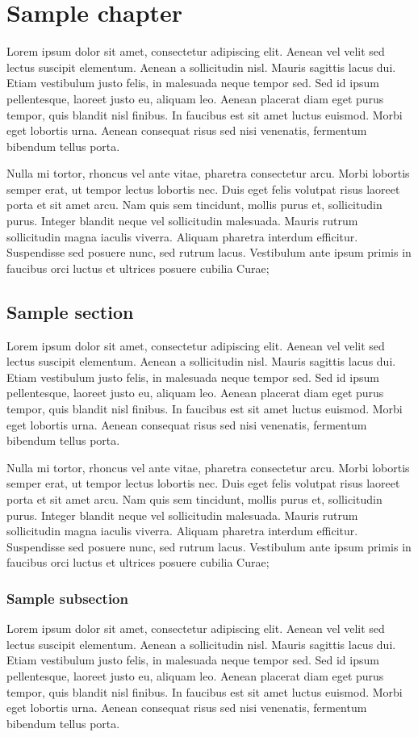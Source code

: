 \chapter{Sample chapter}
Lorem ipsum dolor sit amet, consectetur adipiscing elit. Aenean vel velit sed lectus suscipit elementum. Aenean a sollicitudin nisl. Mauris sagittis lacus dui. Etiam vestibulum justo felis, in malesuada neque tempor sed. Sed id ipsum pellentesque, laoreet justo eu, aliquam leo. Aenean placerat diam eget purus tempor, quis blandit nisl finibus. In faucibus est sit amet luctus euismod. Morbi eget lobortis urna. Aenean consequat risus sed nisi venenatis, fermentum bibendum tellus porta.

Nulla mi tortor, rhoncus vel ante vitae, pharetra consectetur arcu. Morbi lobortis semper erat, ut tempor lectus lobortis nec. Duis eget felis volutpat risus laoreet porta et sit amet arcu. Nam quis sem tincidunt, mollis purus et, sollicitudin purus. Integer blandit neque vel sollicitudin malesuada. Mauris rutrum sollicitudin magna iaculis viverra. Aliquam pharetra interdum efficitur. Suspendisse sed posuere nunc, sed rutrum lacus. Vestibulum ante ipsum primis in faucibus orci luctus et ultrices posuere cubilia Curae;


\section{Sample section}
Lorem ipsum dolor sit amet, consectetur adipiscing elit. Aenean vel velit sed lectus suscipit elementum. Aenean a sollicitudin nisl. Mauris sagittis lacus dui. Etiam vestibulum justo felis, in malesuada neque tempor sed. Sed id ipsum pellentesque, laoreet justo eu, aliquam leo. Aenean placerat diam eget purus tempor, quis blandit nisl finibus. In faucibus est sit amet luctus euismod. Morbi eget lobortis urna. Aenean consequat risus sed nisi venenatis, fermentum bibendum tellus porta.

Nulla mi tortor, rhoncus vel ante vitae, pharetra consectetur arcu. Morbi lobortis semper erat, ut tempor lectus lobortis nec. Duis eget felis volutpat risus laoreet porta et sit amet arcu. Nam quis sem tincidunt, mollis purus et, sollicitudin purus. Integer blandit neque vel sollicitudin malesuada. Mauris rutrum sollicitudin magna iaculis viverra. Aliquam pharetra interdum efficitur. Suspendisse sed posuere nunc, sed rutrum lacus. Vestibulum ante ipsum primis in faucibus orci luctus et ultrices posuere cubilia Curae;


\subsection{Sample subsection}
Lorem ipsum dolor sit amet, consectetur adipiscing elit. Aenean vel velit sed lectus suscipit elementum. Aenean a sollicitudin nisl. Mauris sagittis lacus dui. Etiam vestibulum justo felis, in malesuada neque tempor sed. Sed id ipsum pellentesque, laoreet justo eu, aliquam leo. Aenean placerat diam eget purus tempor, quis blandit nisl finibus. In faucibus est sit amet luctus euismod. Morbi eget lobortis urna. Aenean consequat risus sed nisi venenatis, fermentum bibendum tellus porta.

